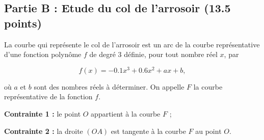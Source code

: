 \documentclass[answers]{exam}
\begin{document}
\subsection*{Partie B : Etude du col de l'arrosoir (13.5 points)}

La courbe qui représente le col de l'arrosoir est un arc de la courbe
représentative d'une fonction polynôme $f$ de degré 3 définie, pour tout
nombre réel $x$, par

\[
  f(x)=-0.1x^{3}+0.6x^{2}+ax+b ,
\]

où $a$ et $b$ sont des nombres réels à déterminer.
On appelle $F$ la courbe représentative de la fonction $f$.

\begin{compactenum}
  \item \textbf{Contrainte 1 :} le point $O$ appartient à la courbe $F$ ;
  \item \textbf{Contrainte 2 :} la droite $(OA)$ est tangente à la courbe $F$ au point $O$.
\end{compactenum}
\end{document}

